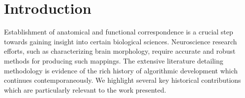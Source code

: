 \documentclass{frontiersSCNS}
\begin{document}
%
%
%







\section{Introduction}

Establishment of anatomical and functional correspondence
is a crucial step towards gaining insight into certain biological
sciences.  Neuroscience research efforts, such as characterizing
brain morphology, require accurate and robust methods for
producing such mappings.  The
extensive literature detailing methodology is evidence of the rich history of
algorithmic development which continues contemporaneously.
We highlight several key historical contributions which are particularly relevant to the work presented.
\end{document}
